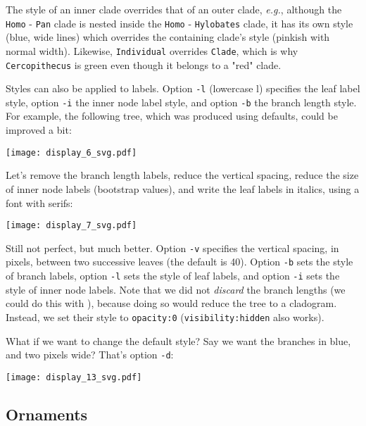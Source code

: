 The style of an inner clade overrides that of an outer clade, \textit{e.g.},
although the \texttt{Homo} - \texttt{Pan} clade is nested inside the
\texttt{Homo} - \texttt{Hylobates} clade, it has its own style (blue, wide
lines) which overrides the containing clade's style (pinkish with normal
width).  Likewise, \texttt{Individual} overrides \texttt{Clade}, which is why
\texttt{Cercopithecus} is green even though it belongs to a "red" clade.

\bigskip

Styles can also be applied to labels. Option \texttt{-l} (lowercase l) specifies
the leaf label style, option \texttt{-i} the inner node label style, and option
\texttt{-b} the branch length style. For example, the following tree, which was
produced using defaults, could be improved a bit:


\begin{center}
  \texttt{[image: display\_6\_svg.pdf]}
\end{center}

\noindent{}Let's remove the branch length labels, reduce
the vertical spacing, reduce the size of inner node labels (bootstrap values),
and write the leaf labels in italics, using a font with serifs:


\begin{center}
  \texttt{[image: display\_7\_svg.pdf]}
\end{center}

\noindent{}Still not perfect, but much better. Option \texttt{-v} specifies the
vertical spacing, in pixels, between two successive leaves (the default is 40).
Option \texttt{-b} sets the style of branch labels, option \texttt{-l} sets the
style of leaf labels, and option \texttt{-i} sets the style of inner node
labels. Note that we did not \emph{discard} the branch lengths (we could do
this with \topology), because doing so would reduce the tree to a cladogram.
Instead, we set their \css{} style to \texttt{opacity:0}
(\texttt{visibility:hidden} also works).

What if we want to change the default style? Say we want the branches in blue,
and two pixels wide? That's option \texttt{-d}:


\begin{center}
  \texttt{[image: display\_13\_svg.pdf]}
\end{center}

\subsection{Ornaments}

